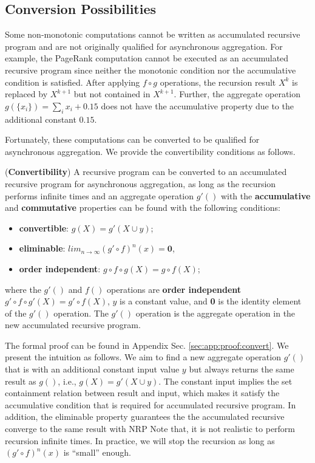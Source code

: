 \subsection{Conversion Possibilities}
\label{sec:async:convert}

Some non-monotonic computations cannot be written as accumulated recursive program and are not originally qualified for asynchronous aggregation. For example, the PageRank computation cannot be executed as an accumulated recursive program since neither the monotonic condition nor the accumulative condition is satisfied. After applying $f\circ g$ operations, the recursion result $X^{k}$ is replaced by $X^{k+1}$ but not contained in $X^{k+1}$. Further, the aggregate operation $g(\{x_i\})=\sum_i{x_i}+0.15$ does not have the accumulative property due to the additional constant $0.15$.

Fortunately, these computations can be converted to be qualified for asynchronous aggregation. We provide the convertibility conditions as follows.

\begin{theorem}
	\label{th:convert}
	(\textbf{Convertibility}) A recursive program can be converted to an accumulated recursive program for asynchronous aggregation, as long as the recursion performs infinite times and an aggregate operation $g'()$ with the \textbf{accumulative} and \textbf{commutative} properties can be found with the following conditions:
	\begin{itemize}
		\item \textbf{convertible}: $g(X)=g'(X\cup y)$;
		\item \textbf{eliminable}: $lim_{n\rightarrow\infty}(g'\circ f)^n(x)=\textbf{0}$,
\item \textbf{order independent}: $g\circ f\circ g(X)=g\circ f(X)$;
	\end{itemize}
	where the $g'()$ and $f()$ operations are \textbf{order independent} $g'\circ f\circ g'(X)=g'\circ f(X)$, $y$ is a constant value, and \textbf{0} is the identity element of the $g'()$ operation. The $g'()$ operation is the aggregate operation in the new accumulated recursive program.
\end{theorem}

The formal proof can be found in Appendix Sec. \ref{sec:app:proof:convert}. We present the intuition as follows. We aim to find a new aggregate operation $g'()$ that is with an additional constant input value $y$ but always returns the same result as $g()$, i.e., $g(X)=g'(X\cup y)$. The constant input implies the set containment relation between result and input, which makes it satisfy the %
accumulative condition that is required for accumulated recursive program. In addition, the eliminable property guarantees the %
the accumulated recursive converge to the same result with NRP %
Note that, it is not realistic to perform recursion infinite times. In practice, we will stop the recursion as long as $(g'\circ f)^n(x)$ is ``small'' enough.

